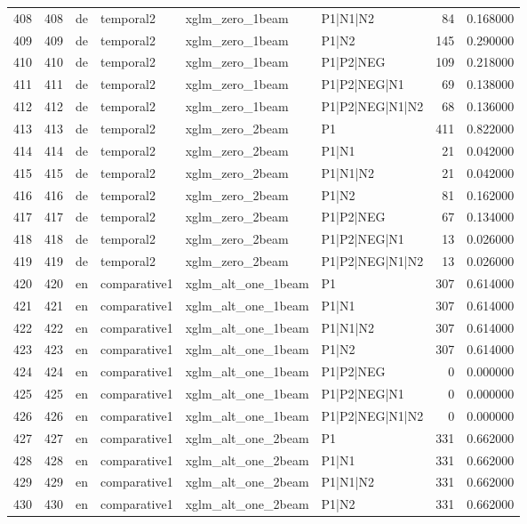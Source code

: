 \begin{tabular}{lrllllrr}
408 & 408 & de & temporal2 & xglm_zero_1beam & P1|N1|N2 & 84 & 0.168000 \\
409 & 409 & de & temporal2 & xglm_zero_1beam & P1|N2 & 145 & 0.290000 \\
410 & 410 & de & temporal2 & xglm_zero_1beam & P1|P2|NEG & 109 & 0.218000 \\
411 & 411 & de & temporal2 & xglm_zero_1beam & P1|P2|NEG|N1 & 69 & 0.138000 \\
412 & 412 & de & temporal2 & xglm_zero_1beam & P1|P2|NEG|N1|N2 & 68 & 0.136000 \\
413 & 413 & de & temporal2 & xglm_zero_2beam & P1 & 411 & 0.822000 \\
414 & 414 & de & temporal2 & xglm_zero_2beam & P1|N1 & 21 & 0.042000 \\
415 & 415 & de & temporal2 & xglm_zero_2beam & P1|N1|N2 & 21 & 0.042000 \\
416 & 416 & de & temporal2 & xglm_zero_2beam & P1|N2 & 81 & 0.162000 \\
417 & 417 & de & temporal2 & xglm_zero_2beam & P1|P2|NEG & 67 & 0.134000 \\
418 & 418 & de & temporal2 & xglm_zero_2beam & P1|P2|NEG|N1 & 13 & 0.026000 \\
419 & 419 & de & temporal2 & xglm_zero_2beam & P1|P2|NEG|N1|N2 & 13 & 0.026000 \\
420 & 420 & en & comparative1 & xglm_alt_one_1beam & P1 & 307 & 0.614000 \\
421 & 421 & en & comparative1 & xglm_alt_one_1beam & P1|N1 & 307 & 0.614000 \\
422 & 422 & en & comparative1 & xglm_alt_one_1beam & P1|N1|N2 & 307 & 0.614000 \\
423 & 423 & en & comparative1 & xglm_alt_one_1beam & P1|N2 & 307 & 0.614000 \\
424 & 424 & en & comparative1 & xglm_alt_one_1beam & P1|P2|NEG & 0 & 0.000000 \\
425 & 425 & en & comparative1 & xglm_alt_one_1beam & P1|P2|NEG|N1 & 0 & 0.000000 \\
426 & 426 & en & comparative1 & xglm_alt_one_1beam & P1|P2|NEG|N1|N2 & 0 & 0.000000 \\
427 & 427 & en & comparative1 & xglm_alt_one_2beam & P1 & 331 & 0.662000 \\
428 & 428 & en & comparative1 & xglm_alt_one_2beam & P1|N1 & 331 & 0.662000 \\
429 & 429 & en & comparative1 & xglm_alt_one_2beam & P1|N1|N2 & 331 & 0.662000 \\
430 & 430 & en & comparative1 & xglm_alt_one_2beam & P1|N2 & 331 & 0.662000 \\

\end{tabular}

